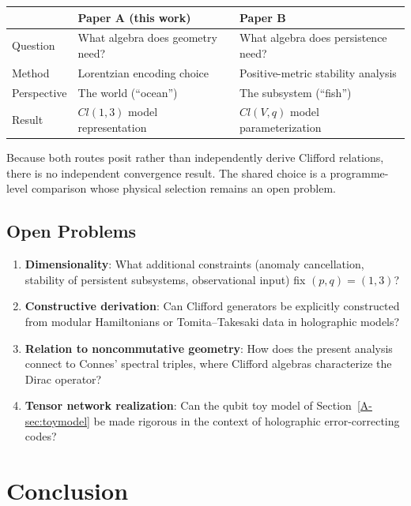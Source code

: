 \documentclass[12pt,a4paper,openany]{book}
\begin{document}
\begin{center}
\begin{tabular}{@{}lll@{}}
\toprule
& \textbf{Paper A (this work)} & \textbf{Paper B} \\
\midrule
Question & What algebra does geometry need? & What algebra does persistence need? \\
Method & Lorentzian encoding choice & Positive-metric stability analysis \\
Perspective & The world (``ocean'') & The subsystem (``fish'') \\
Result & $Cl(1,3)$ model representation & $Cl(V,q)$ model parameterization \\
\bottomrule
\end{tabular}
\end{center}

Because both routes posit rather than independently derive Clifford relations, there is no independent convergence result.  The shared choice is a programme-level comparison whose physical selection remains an open problem.

\subsection{Open Problems}

\begin{enumerate}
\item \textbf{Dimensionality}: What additional constraints (anomaly cancellation, stability of persistent subsystems, observational input) fix $(p,q) = (1,3)$?
\item \textbf{Constructive derivation}: Can Clifford generators be explicitly constructed from modular Hamiltonians or Tomita--Takesaki data in holographic models?
\item \textbf{Relation to noncommutative geometry}: How does the present analysis connect to Connes' spectral triples, where Clifford algebras characterize the Dirac operator?
\item \textbf{Tensor network realization}: Can the qubit toy model of Section~\ref{A-sec:toymodel} be made rigorous in the context of holographic error-correcting codes?
\end{enumerate}

\section{Conclusion}
\end{document}
